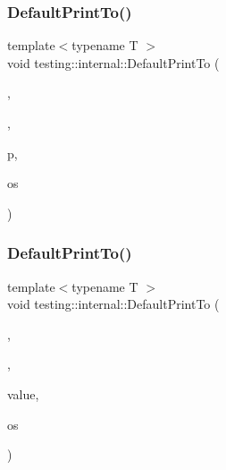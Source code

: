 \subsubsection{\texorpdfstring{DefaultPrintTo()}{DefaultPrintTo()}\hspace{0.1cm}{\footnotesize\ttfamily [2/3]}}
{\footnotesize\ttfamily template$<$typename T $>$ \\
void testing\+::internal\+::\+Default\+Print\+To (\begin{DoxyParamCaption}\item[{\mbox{\hyperlink{namespacetesting_1_1internal_abf080521ce135deb510e0a7830fd3d33}{Is\+Not\+Container}}}]{,  }\item[{\mbox{\hyperlink{namespacetesting_1_1internal_a62f917c3424d8841de9b49b5ec28edb4}{true\+\_\+type}}}]{,  }\item[{T $\ast$}]{p,  }\item[{\+::std\+::ostream $\ast$}]{os }\end{DoxyParamCaption})}

\mbox{\label{namespacetesting_1_1internal_a78e4937ba564f01dac2ff25f3eece0ec}} 
\subsubsection{\texorpdfstring{DefaultPrintTo()}{DefaultPrintTo()}\hspace{0.1cm}{\footnotesize\ttfamily [3/3]}}
{\footnotesize\ttfamily template$<$typename T $>$ \\
void testing\+::internal\+::\+Default\+Print\+To (\begin{DoxyParamCaption}\item[{\mbox{\hyperlink{namespacetesting_1_1internal_abf080521ce135deb510e0a7830fd3d33}{Is\+Not\+Container}}}]{,  }\item[{\mbox{\hyperlink{namespacetesting_1_1internal_abb1d0789f19bdde21affccbd1078b525}{false\+\_\+type}}}]{,  }\item[{const T \&}]{value,  }\item[{\+::std\+::ostream $\ast$}]{os }\end{DoxyParamCaption})}

\mbox{\label{namespacetesting_1_1internal_a513107ff8defa97d949937fc1350a56c}} 
